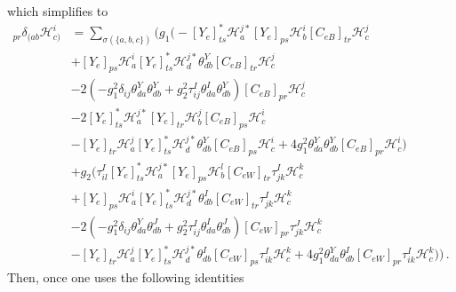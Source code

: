 which simplifies to
\begin{align}
[\dot C_{eH}]_{pr}\delta_{(ab}\mathcal{H}_{c)}^{i} &= \sum_{\sigma(\{a,b,c\})}\Big(g_1\Big(
-[Y_e]^*_{ts}\mathcal{H}_a^{j*}[Y_e]_{ps}\mathcal{H}_b^{i}[C_{eB}]_{tr}\mathcal{H}_c^{j} \nonumber \\&
+ [Y_e]_{ps}\mathcal{H}_a^{i}[Y_e]^*_{ts}\mathcal{H}_d^{j*}\theta^Y_{db}[C_{eB}]_{tr}\mathcal{H}_c^{j} \nonumber \\&
- 2\left(-g_1^2 \delta_{ij}\theta^Y_{da}\theta^Y_{db} + g_2^2 \tau^{I}_{ij} \theta^I_{da}\theta^Y_{db}\right)[C_{eB}]_{pr}\mathcal{H}_c^{j} \nonumber \\&
- 2 [Y_e]^*_{ts}\mathcal{H}_a^{j*}[Y_e]_{tr}\mathcal{H}_b^{j}[C_{eB}]_{ps}\mathcal{H}_c^{i} \nonumber \\&
- [Y_e]_{tr}\mathcal{H}_a^{j}[Y_e]^*_{ts}\mathcal{H}_d^{j*}\theta^Y_{db}[C_{eB}]_{ps}\mathcal{H}_c^{i} 
+ 4 g_1^2 \theta^Y_{da}\theta^Y_{db}[C_{eB}]_{pr}\mathcal{H}_c^{i}
\Big) \nonumber \\&
+ g_2\Big(
\tau^{I}_{il}[Y_e]^*_{ts}\mathcal{H}_a^{j*}[Y_e]_{ps}\mathcal{H}_b^{l}[C_{eW}]_{tr}\tau^{I}_{jk}\mathcal{H}_c^{k} \nonumber \\&
+ [Y_e]_{ps}\mathcal{H}_a^{i}[Y_e]^*_{ts}\mathcal{H}_d^{j*}\theta^I_{db}[C_{eW}]_{tr}\tau^{I}_{jk}\mathcal{H}_c^{k} \nonumber \\&
- 2\left(-g_1^2 \delta_{ij}\theta^Y_{da}\theta^J_{db} + g_2^2\tau^{I}_{ij}\theta^I_{da}\theta^J_{db}\right)[C_{eW}]_{pr}\tau^{J}_{jk}\mathcal{H}_c^{k} \nonumber \\&
- [Y_e]_{tr}\mathcal{H}_a^{j}[Y_e]^*_{ts}\mathcal{H}_d^{j*}\theta^I_{db}[C_{eW}]_{ps}\tau^{I}_{ik}\mathcal{H}_c^{k} %
+ 4 g_1^2 \theta^Y_{da}\theta^I_{db}[C_{eW}]_{pr}\tau^{I}_{ik}\mathcal{H}_c^{k}
\Big)\Big)
\,.
\end{align}
Then, once one uses the following identities
